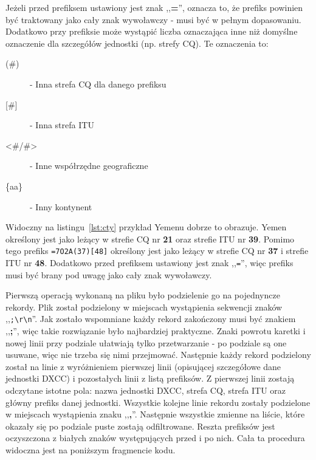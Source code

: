 \documentclass[]{mgr}
\begin{document}
            Jeżeli przed prefiksem ustawiony jest znak ,,\textbf{=}'', oznacza to, że prefiks powinien być traktowany jako cały znak wywoławczy - musi być w pełnym dopasowaniu. Dodatkowo przy prefiksie może wystąpić liczba oznaczająca inne niż domyślne oznaczenie dla szczegółów jednostki (np. strefy CQ). Te oznaczenia to:
            \begin{description}
                \item[(\#)] - Inna strefa CQ dla danego prefiksu
                \item[[\#{]}] - Inna strefa ITU
                \item[<\#/\#>] - Inne współrzędne geograficzne
                \item[\{aa\}] - Inny kontynent
            \end{description}
            Widoczny na listingu~\ref{lst:cty} przykład Yemenu dobrze to obrazuje. Yemen określony jest jako leżący w strefie CQ nr \textbf{21} oraz strefie ITU nr \textbf{39}. Pomimo tego prefiks \texttt{=7O2A(37)[48]} określony jest jako leżący w strefie CQ nr \textbf{37} i strefie ITU nr \textbf{48}. Dodatkowo przed prefiksem ustawiony jest znak ,,\texttt{=}'', więc prefiks musi być brany pod uwagę jako cały znak wywoławczy.

            Pierwszą operacją wykonaną na pliku było podzielenie go na pojednyncze rekordy. Plik został podzielony w miejscach wystąpienia sekwencji znaków ,,\texttt{;\textbackslash r\textbackslash n}''. Jak zostało wspomniane każdy rekord zakończony musi być znakiem ,,\textbf{;}'', więc takie rozwiązanie było najbardziej praktyczne. Znaki powrotu karetki i nowej linii przy podziale ułatwiają tylko przetwarzanie - po podziale są one usuwane, więc nie trzeba się nimi przejmować. Następnie każdy rekord podzielony został na linie z wyróżnieniem pierwszej linii (opisującej szczegółowe dane jednostki DXCC) i pozostałych linii z listą prefiksów. Z pierwszej linii zostają odczytane istotne pola: nazwa jednostki DXCC, strefa CQ, strefa ITU oraz główny prefiks danej jednostki. Wszystkie kolejne linie rekordu zostały podzielone w miejscach wystąpienia znaku ,,\textbf{,}''. Następnie wszystkie zmienne na liście, które okazały się po podziale puste zostają odfiltrowane. Reszta prefiksów jest oczyszczona z białych znaków występujących przed i po nich. Cała ta procedura widoczna jest na poniższym fragmencie kodu.

            
\end{document}
